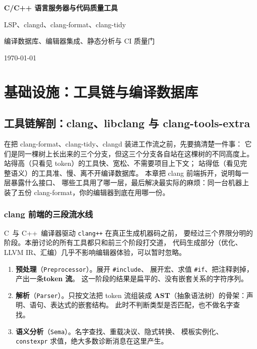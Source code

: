 \documentclass[12pt,a4paper,fontset=fandol]{ctexbook}
\newcommand{\Lang}[1]{\textsf{#1}}
\newcommand{\CL}{\Lang{C}}
\newcommand{\CPP}{\Lang{C++}}
\begin{document}
\frontmatter

\begin{titlepage}
\centering
\vspace*{4cm}
{\Huge\bfseries C/C++ 语言服务器与代码质量工具\par}
\vspace{1cm}
{\LARGE LSP、clangd、clang-format、clang-tidy\par}
\vspace{0.4cm}
{\Large 编译数据库、编辑器集成、静态分析与 CI 质量门\par}
\vfill
{\large \today\par}
\end{titlepage}

\tableofcontents

\mainmatter

\cleardoublepage

\part{基础设施：工具链与编译数据库}
\chapter{工具链解剖：clang、libclang 与 clang-tools-extra}
\label{ch:toolchain}

在把 clang-format、clang-tidy、clangd 装进工作流之前，先要搞清楚一件事：
它们是同一棵树上长出来的三个分支，但这三个分支各自站在这棵树的不同高度上。
站得高（只看见 token）的工具快、宽松、不需要项目上下文；
站得低（看见完整语义）的工具准、慢、离不开编译数据库。
本章把 clang 前端拆开，说明每一层暴露什么接口、
哪些工具用了哪一层，最后解决最实际的麻烦：同一台机器上装了五份
clang-format，你的编辑器到底在用哪一份。

\section{clang 前端的三段流水线}
\label{sec:ch01-s1}

\CL\ 与 \CPP\ 编译器驱动 \texttt{clang++} 在真正生成机器码之前，
要经过三个界限分明的阶段。本册讨论的所有工具都只和前三个阶段打交道，
代码生成部分（优化、LLVM IR、汇编）几乎不影响编辑器体验，可以暂时忽略。

\begin{enumerate}
  \item \textbf{预处理}（\texttt{Preprocessor}）。展开 \texttt{\#include}、
        展开宏、求值 \texttt{\#if}、把注释剥掉，产出一条\textbf{token 流}。
        这一阶段的结果是扁平的、没有嵌套关系的字符序列。
  \item \textbf{解析}（\texttt{Parser}）。只按文法把 token 流组装成
        \textbf{AST}（抽象语法树）的骨架：声明、语句、表达式的嵌套结构。
        此时不判断类型是否匹配，也不做名字查找。
  \item \textbf{语义分析}（\texttt{Sema}）。名字查找、重载决议、隐式转换、
        模板实例化、\texttt{constexpr} 求值，绝大多数诊断消息在这里产生。
\end{enumerate}
\end{document}
